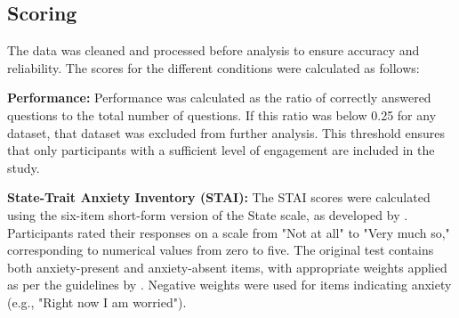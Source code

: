 \subsection{Scoring}

The data was cleaned and processed before analysis to ensure accuracy and reliability. The scores for the different conditions were calculated as follows:

\begin{APAitemize}
\item \textbf{Performance:} Performance was calculated as the ratio of correctly answered questions to the total number of questions. If this ratio was below 0.25 for any dataset, that dataset was excluded from further analysis. This threshold ensures that only participants with a sufficient level of engagement are included in the study.
\item \textbf{State-Trait Anxiety Inventory (STAI):} The STAI scores were calculated using the six-item short-form version of the State scale, as developed by \textcite{marteauDevelopmentSixitemShortform1992}. Participants rated their responses on a scale from "Not at all" to "Very much so," corresponding to numerical values from zero to five. The original test contains both anxiety-present and anxiety-absent items, with appropriate weights applied as per the guidelines by \textcite{marteauDevelopmentSixitemShortform1992}. Negative weights were used for items indicating anxiety (e.g., "Right now I am worried").
\end{APAitemize}